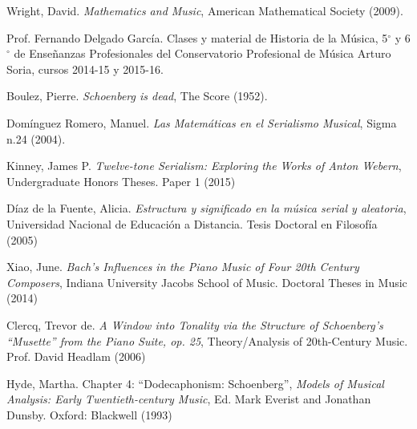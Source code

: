 	\begin{thebibliography}{00}
			
			
			{\sc Wright, David.} 
			\textit{Mathematics and Music},
			American Mathematical Society 
			(2009).
			

			{\sc Prof. Fernando Delgado García.} 
			Clases y material de Historia de la Música, 5$^{\circ}$ y 6$^{\circ}$ de Enseñanzas Profesionales del Conservatorio Profesional de Música Arturo Soria, cursos 2014-15 y 2015-16.
			
			{\sc Boulez, Pierre.}
			\textit{Schoenberg is dead},
			The Score
			(1952).

			{\sc Domínguez Romero, Manuel.} 
			\textit{Las Matemáticas en el Serialismo Musical},
			Sigma n.24 
			(2004).
			
			
			{\sc Kinney, James P.} 
			\textit{Twelve-tone Serialism: Exploring the Works of Anton Webern},
			Undergraduate Honors Theses.
			Paper 1
			(2015)
			
			{\sc Díaz de la Fuente, Alicia.} 
			\textit{Estructura y significado en la música serial y aleatoria},
			Universidad Nacional de Educación a Distancia.
			Tesis Doctoral en Filosofía
			(2005)

					
			{\sc Xiao, June.} 
			\textit{Bach’s Influences in the Piano Music of Four 20th Century Composers},
			Indiana University Jacobs School of Music.
			Doctoral Theses in Music
			(2014)
			
			{\sc Clercq, Trevor de.} 
			\textit{A Window into Tonality via the Structure of Schoenberg's ``Musette'' from the Piano Suite, op. 25},
			Theory/Analysis of 20th-Century Music.
			Prof. David Headlam
			(2006)
			
			{\sc Hyde, Martha.} Chapter 4: “Dodecaphonism: Schoenberg”,
			\textit{Models of Musical Analysis: Early Twentieth-century Music},
			Ed. Mark Everist and Jonathan Dunsby.
			Oxford: Blackwell
			(1993)
			

\end{thebibliography}

